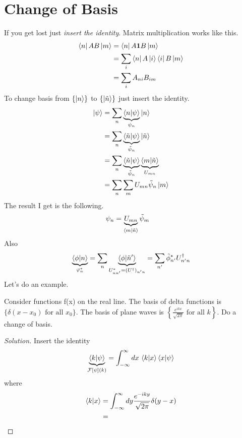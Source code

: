 \section{Change of Basis}
If you get lost just \emph{insert the identity}.
Matrix multiplication works like this.
\begin{align}
    \bra{n}AB\ket{m} &=
    \bra{n} A \mathbf{1} B \ket{m}\\
    &= \sum_i \bra{n}A\ket{i} \bra{i} B\ket{m}\\
    &= \sum_i A_{ni} B_{im}
\end{align}
To change basis from $\{\ket{n}\}$ to $\{\ket{\tilde{n}}\}$
just insert the identity.
\begin{align}
    \ket{\psi} &=
    \sum_n \underbrace{\braket{n}{\psi}}_{\psi_n}\ket{n}\\
    &= \sum_n \underbrace{\braket{\tilde{n}}{\psi}}_{\tilde{\psi}_n}
    \ket{\tilde{n}}\\
    &= \sum_n
    \underbrace{\braket{\tilde{n}}{\psi}}_{\tilde{\psi}_n}
    \underbrace{\braket{m}{\tilde{n}}}_{U_{mn}}\\
    &= \sum_n \sum_m U_{mn} \tilde{\psi}_n \ket{m}
\end{align}
The result I get is the following.
\begin{align}
    \psi_n &= 
    \underbrace{U_{mn}}_{\braket{m}{\tilde{n}}}
    \tilde{\psi}_m
\end{align}
Also
\begin{align}
    \underbrace{\braket{\phi}{n}}_{\varphi_n^*}
    = \sum_n
    \underbrace{\braket{\phi}{\tilde{n}'}}_{
    U_{nn'}^* = (U^\dagger)_{n'n}
    }
    = \sum_{n'} \tilde{\phi}_{n'}^* U^\dagger_{n'n}
\end{align}
Let's do an example.
\begin{example}
    Consider functions f(x) on the real line.
    The basis of delta functions is
    $\{\delta(x - x_0)\text{ for all }x_0 \}$.
    The basis of plane waves is
    $\left\{\frac{e^{ikx}}{\sqrt{2\pi}}\text{ for all } k \right\}$.
    Do a change of basis.
\end{example}
\begin{proof}[Solution]
    Insert the identity
    \begin{align}
        \underbrace{\braket{k}{\psi}}_{\mathcal{F}[\psi](k)} =
        \int_{-\infty}^{\infty}dx\,
        \braket{k}{x}
        \braket{x}{\psi}
    \end{align}
    where
    \begin{align}
        \braket{k}{x} &=
        \int_{-\infty}^{\infty} dy \frac{e^{-iky}}{\sqrt{2\pi}}\delta(y - x)\\
        &=
    \end{align}
\end{proof}

